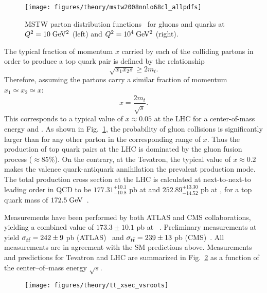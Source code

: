 \begin{figure}[!htb]\centering
  \texttt{[image: figures/theory/mstw2008nnlo68cl\_allpdfs]}
  \caption{MSTW parton distribution functions~\cite{ct10} for gluons
    and quarks at $Q^2=10\; \mathrm{GeV}{}^2$ (left) and $Q^2=10^4\; \mathrm{GeV}{}^2$ (right).}
  \label{fig:pdfs}
\end{figure}

The typical fraction of momentum $x$ carried by each of the colliding
partons in order to produce a top quark pair is defined by the
relationship
\begin{equation}
\sqrt{x_1x_2s}\geq{}2m_t.
\end{equation}
Therefore, assuming the partons carry a similar fraction of momentum
$x_1\simeq{}x_2\simeq{}x$:
\begin{equation}
x=\frac{2m_t}{\sqrt{s}}
.
\end{equation}
This corresponds to a typical value of $x\approx{}0.05$ at the LHC for
a center-of-mass energy \seventev{} and \eighttev{}. As shown in
Fig.~\ref{fig:pdfs}, the probability of gluon collisions is
significantly larger than for any other parton in the corresponding
range of $x$. Thus the production of top quark pairs at the LHC is
dominated by the gluon fusion process ($\approx{}85\%$). On the
contrary, at the Tevatron, the typical value of $x\approx{}0.2$ makes
the valence quark-antiquark annihilation the prevalent \ttbar{}
production mode.
The total \ttbar{} production cross section at the LHC is calculated
at next-to-next-to leading order in
QCD to be
$177.31^{+10.1}_{-10.8}$ pb at \seventev{} and
$252.89^{+13.30}_{-14.52}$ pb at \eighttev{}, for a top quark mass of
$172.5 \; \mathrm{GeV}{}$~\cite{ttxs1,ttxs2,ttxs3,ttxs4,ttxs5,ttxs6,ttxs7}.
 
Measurements have been performed by both ATLAS and CMS
collaborations, yielding a combined value of $173.3\pm10.1$ pb at
\seventev{}~\cite{ATLAS-CONF-2012-134,CMS-PAS-TOP-12-003}. Preliminary
measurements at \eighttev{} yield $\sigma_{t\bar{t}{}}=242\pm{}9$ pb
(ATLAS)~\cite{Aad:2014kva} and $\sigma_{t\bar{t}{}}=239\pm{}13$ pb
(CMS)~\cite{Chatrchyan:2013faa}. All measurements are in agreement
with the SM predictions above. Measurements and predictions for
Tevatron and LHC are summarized in Fig.~\ref{fig:ttxs} as a function
of the center--of--mass energy $\sqrt{s}$.
\begin{figure}[!htb]\centering
  \texttt{[image: figures/theory/tt\_xsec\_vsroots]}
  \caption{}
  \label{fig:ttxs}
\end{figure}

